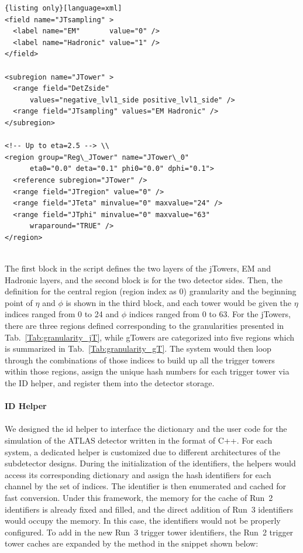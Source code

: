 \begin{lstlisting}{listing only}[language=xml]
<field name="JTsampling" > 
  <label name="EM"       value="0" /> 
  <label name="Hadronic" value="1" /> 
</field> 
	
<subregion name="JTower" > 
  <range field="DetZside"
      values="negative_lvl1_side positive_lvl1_side" /> 
  <range field="JTsampling" values="EM Hadronic" /> 
</subregion> 
	
<!-- Up to eta=2.5 --> \\
<region group="Reg\_JTower" name="JTower\_0" 
      eta0="0.0" deta="0.1" phi0="0.0" dphi="0.1"> 
  <reference subregion="JTower" /> 
  <range field="JTregion" value="0" /> 
  <range field="JTeta" minvalue="0" maxvalue="24" />
  <range field="JTphi" minvalue="0" maxvalue="63" 
      wraparound="TRUE" /> 
</region>
	
\end{lstlisting}
\noindent
The first block in the script defines the two layers of the jTowers, EM and Hadronic layers, and the second block is for the two detector sides. Then, the definition for the central region (region index as 0) granularity and the beginning point of $\eta$ and $\phi$ is shown in the third block, and each tower would be given the $\eta$ indices ranged from 0 to 24 and $\phi$ indices ranged from 0 to 63. For the jTowers, there are three regions defined corresponding to the granularities presented in Tab.~\ref{Tab:granularity_jT}, while gTowers are categorized into five regions which is summarized in Tab.~\ref{Tab:granularity_gT}. The system would then loop through the combinations of those indices to build up all the trigger towers within those regions, assign the unique hash numbers for each trigger tower via the ID helper, and register them into the detector storage\cite{Calafiura:2003gf}.
\\
\\{\bf ID Helper}
\\
\\We designed the id helper to interface the dictionary and the user code for the simulation of the ATLAS detector written in the format of C++. For each system, a dedicated helper is customized due to different architectures of the subdetector designs. During the initialization of the identifiers, the helpers would access its corresponding dictionary and assign the hash identifiers for each channel by the set of indices. The identifier is then enumerated and cached for fast conversion. Under this framework, the memory for the cache of Run~2 identifiers is already fixed and filled, and the direct addition of Run~3 identifiers would occupy the memory. In this case, the identifiers would not be properly configured. To add in the new Run~3 trigger tower identifiers, the Run~2 trigger tower caches are expanded by the method in the snippet shown below:

